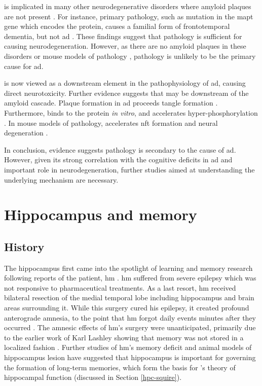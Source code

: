 \atau{} is implicated in many other neurodegenerative disorders where amyloid plaques are not present \citep[e.g.][]{williams09, mckee16}. For instance, primary \atau{} pathology, such as mutation in the \gls{mapt} gene which encodes the \atau{} protein, causes a familial form of frontotemporal dementia, but not \gls{ad} \citep{hutton98, poorkaj98}. These findings suggest that \atau{} pathology is sufficient for causing neurodegeneration. However, as there are no amyloid plaques in these disorders or mouse models of \atau{} pathology \citep{gotz04}, \atau{} pathology is unlikely to be the primary cause for \gls{ad}.

\atau{} is now viewed as a downstream element in the pathophysiology of \gls{ad}, causing direct neurotoxicity. Further evidence suggests that \atau{} may be downstream of the amyloid cascade. Plaque formation in \gls{ad} proceeds tangle formation \citep{price99}. Furthermore, \abeta{} binds to the \atau{} protein \textit{in vitro}, and accelerates \atau{} hyper-phosphorylation \citep{guo06, zempel10}. In mouse models of \atau{} pathology, \abeta{} accelerates \gls{nft} formation and neural degeneration \citep{lewis01, terwel08}.

In conclusion, evidence suggests \atau{} pathology is secondary to the cause of \gls{ad}. However, given its strong correlation with the cognitive deficits in \gls{ad} and important role in neurodegeneration, further studies aimed at understanding the underlying mechanism are necessary. 

\section{Hippocampus and memory}
\subsection{History}
The hippocampus first came into the spotlight of learning and memory research following reports of the patient, \gls{hm} \citep{scoville57, squire09}. \Gls{hm} suffered from severe epilepsy which was not responsive to pharmaceutical treatments. As a last resort, \gls{hm} received bilateral resection of the medial temporal lobe including hippocampus and brain areas surrounding it. While this surgery cured his epilepsy, it created profound anterograde amnesia, to the point that \gls{hm} forgot daily events minutes after they occurred \citep{scoville57, squire09}. The amnesic effects of \gls{hm}'s surgery were unanticipated, primarily due to the earlier work of Karl Lashley showing that memory was not stored in a localized fashion \citep{bruce01}. Further studies of \gls{hm}'s memory deficit and animal models of hippocampus lesion have suggested that hippocampus is important for governing the formation of long-term memories, which form the basis for \citet{squire91}'s theory of hippocampal function (discussed in Section \ref{hpc-squire}).

